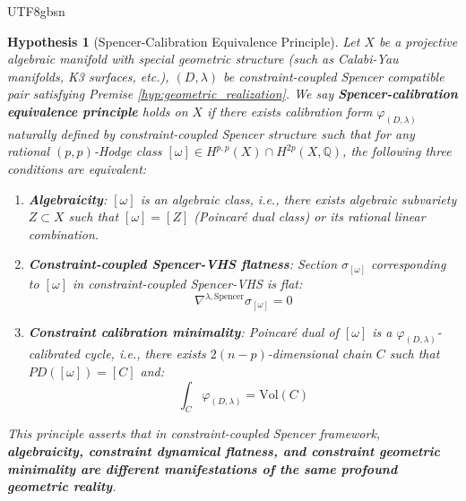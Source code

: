 \documentclass[a4paper,12pt]{extarticle}
\newtheorem{hypothesis}[theorem]{Hypothesis}
\theoremstyle{definition}
\begin{document}
\begin{CJK}{UTF8}{gbsn}
\begin{hypothesis}[Spencer-Calibration Equivalence Principle]
\label{hyp:spencer_calibration_principle}
Let $X$ be a projective algebraic manifold with special geometric structure (such as Calabi-Yau manifolds, K3 surfaces, etc.), $(D, \lambda)$ be constraint-coupled Spencer compatible pair satisfying Premise \ref{hyp:geometric_realization}. We say \textbf{Spencer-calibration equivalence principle} holds on $X$ if there exists calibration form $\varphi_{(D,\lambda)}$ naturally defined by constraint-coupled Spencer structure such that for any rational $(p,p)$-Hodge class $[\omega] \in H^{p,p}(X) \cap H^{2p}(X, \mathbb{Q})$, the following three conditions are equivalent:
\begin{enumerate}
    \item \textbf{Algebraicity}: $[\omega]$ is an algebraic class, i.e., there exists algebraic subvariety $Z \subset X$ such that $[\omega] = [Z]$ (Poincaré dual class) or its rational linear combination.
    \item \textbf{Constraint-coupled Spencer-VHS flatness}: Section $\sigma_{[\omega]}$ corresponding to $[\omega]$ in constraint-coupled Spencer-VHS is flat:
    \begin{equation}
    \label{eq:spencer_vhs_flatness}
    \nabla^{\lambda,\text{Spencer}} \sigma_{[\omega]} = 0
    \end{equation}
    \item \textbf{Constraint calibration minimality}: Poincaré dual of $[\omega]$ is a $\varphi_{(D,\lambda)}$-calibrated cycle, i.e., there exists $2(n-p)$-dimensional chain $C$ such that $PD([\omega]) = [C]$ and:
    \begin{equation}
    \label{eq:calibration_condition}
    \int_C \varphi_{(D,\lambda)} = \text{Vol}(C)
    \end{equation}
\end{enumerate}

This principle asserts that in constraint-coupled Spencer framework, \textbf{algebraicity, constraint dynamical flatness, and constraint geometric minimality are different manifestations of the same profound geometric reality}.
\end{hypothesis}


\end{CJK}
\end{document}
